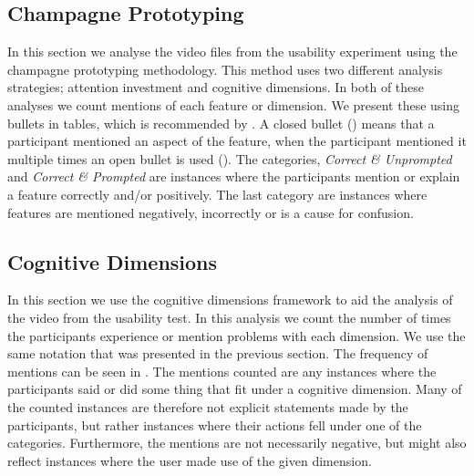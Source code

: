 \subsection{Champagne Prototyping}
In this section we analyse the video files from the usability experiment using the champagne prototyping methodology. This method uses two different analysis strategies; attention investment and cognitive dimensions. In both of these analyses we count mentions of each feature or dimension. We present these using bullets in tables, which is recommended by \cite{blackwell2004champagne}. A closed bullet (\mn) means that a participant mentioned an aspect of the feature, when the participant mentioned it multiple times an open bullet is used (\mns). The categories, \textit{Correct \& Unprompted} and \textit{Correct \& Prompted} are instances where the participants mention or explain a feature correctly and/or positively. The last category are instances where features are mentioned negatively, incorrectly or is a cause for confusion.



\subsection{Cognitive Dimensions}
In this section we use the cognitive dimensions framework to aid the analysis of the video from the usability test. In this analysis we count the number of times the participants experience or mention problems with each dimension. We use the same notation that was presented in the previous section. The frequency of mentions can be seen in . The mentions counted are any instances where the participants said or did some thing that fit under a cognitive dimension. Many of the counted instances are therefore not explicit statements made by the participants, but rather instances where their actions fell under one of the categories. Furthermore, the mentions are not necessarily negative, but might also reflect instances where the user made use of the given dimension.

\begin{table}[H]
	\caption{Cognitive Dimensions Findings}
	\label{tab:cog-dim-findings}
\end{table}

